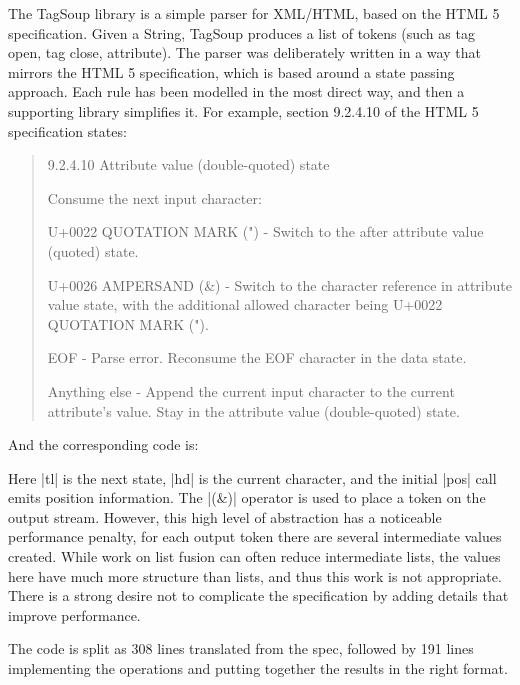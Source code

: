 \documentclass[draft]{sigplanconf}
\begin{document}
\begin{code}
The TagSoup library \cite{tagsoup} is a simple parser for XML/HTML, based on the HTML 5 specification. Given a String, TagSoup produces a list of tokens (such as tag open, tag close, attribute). The parser was deliberately written in a way that mirrors the HTML 5 specification, which is based around a state passing approach. Each rule has been modelled in the most direct way, and then a supporting library simplifies it. For example, section 9.2.4.10 of the HTML 5 specification states:

\begin{quote}
9.2.4.10 Attribute value (double-quoted) state

Consume the next input character:

U+0022 QUOTATION MARK (") - Switch to the after attribute value (quoted) state.

U+0026 AMPERSAND (\&) - Switch to the character reference in attribute value state, with the additional allowed character being U+0022 QUOTATION MARK (").

EOF - Parse error. Reconsume the EOF character in the data state.

Anything else - Append the current input character to the current attribute's value. Stay in the attribute value (double-quoted) state.
\end{quote}

And the corresponding code is:


Here |tl| is the next state, |hd| is the current character, and the initial |pos| call emits position information. The |(&)| operator is used to place a token on the output stream. However, this high level of abstraction has a noticeable performance penalty, for each output token there are several intermediate values created. While work on list fusion can often reduce intermediate lists, the values here have much more structure than lists, and thus this work is not appropriate. There is a strong desire not to complicate the specification by adding details that improve performance.

The code is split as 308 lines translated from the spec, followed by 191 lines implementing the operations and putting together the results in the right format.


\end{code}
\end{document}
